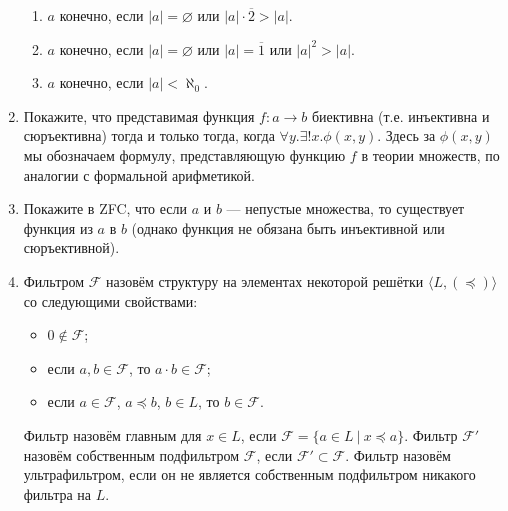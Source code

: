 \documentclass[10pt,a4paper,oneside]{article}
\begin{document}
\begin{enumerate}
\begin{enumerate}
\item $a$ конечно, если $|a|=\varnothing$ или $|a|\cdot\overline{2} > |a|$.
\item $a$ конечно, если $|a|=\varnothing$ или $|a|=\overline{1}$ или $|a|^2 > |a|$.
\item $a$ конечно, если $|a|<\aleph_0$.
\end{enumerate}
\item Покажите, что представимая функция $f: a \rightarrow b$ биективна (т.е. инъективна и сюръективна) тогда и только тогда,
когда $\forall y.\exists!x.\phi(x,y)$. Здесь за $\phi(x,y)$ мы обозначаем формулу, представляющую функцию $f$
в теории множеств, по аналогии с формальной арифметикой.
\item Покажите в ZFC, что если $a$ и $b$ --- непустые множества, то существует функция из $a$ в $b$ 
(однако функция не обязана быть инъективной или сюръективной).

\item Фильтром $\mathcal{F}$ назовём структуру на элементах некоторой решётки $\langle L, (\preceq) \rangle$ со следующими свойствами:
\begin{itemize}
\item $0 \notin \mathcal{F}$;
\item если $a,b \in \mathcal{F}$, то $a \cdot b \in \mathcal{F}$;
\item если $a \in \mathcal{F}$, $a \preceq b$, $b \in L$, то $b \in \mathcal{F}$.
\end{itemize}

Фильтр назовём главным для $x \in L$, если $\mathcal{F} = \{ a\in L\ |\ x \preceq a \}$.
Фильтр $\mathcal{F'}$ назовём собственным подфильтром $\mathcal{F}$, если $\mathcal{F'} \subset \mathcal{F}$.
Фильтр назовём ультрафильтром, если он не является собственным подфильтром никакого фильтра на $L$.


\end{enumerate}
\end{document}
